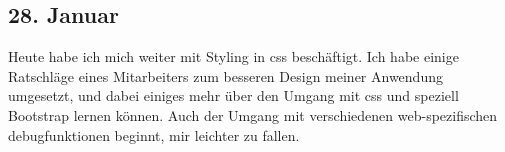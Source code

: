 \subsection{28. Januar}
Heute habe ich mich weiter mit Styling in css beschäftigt. Ich habe einige Ratschläge eines Mitarbeiters zum besseren Design meiner Anwendung umgesetzt, und dabei einiges mehr über den Umgang mit css und speziell Bootstrap lernen können. Auch der Umgang mit verschiedenen web-spezifischen debugfunktionen beginnt, mir leichter zu fallen.